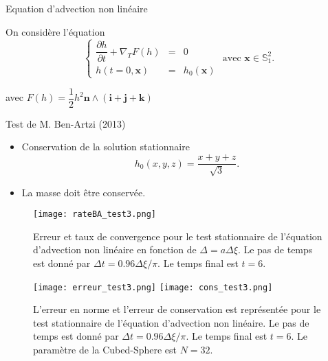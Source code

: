 \documentclass[11pt]{beamer}
\begin{document}
\begin{frame}{Equation d'advection non linéaire}

On considère l'équation
$$
\left\lbrace
\begin{array}{rcl}
\dfrac{\partial h}{\partial t} + \nabla_T F(h) & = & 0  \\
h(t=0,\mathbf{x}) & = & h_0(\mathbf{x})
\end{array}
\right. \text{ avec } \mathbf{x} \in \mathbb{S}_1^2.
$$

avec $F(h) = \dfrac{1}{2} h^2 \mathbf{n} \wedge (\mathbf{i} + \mathbf{j} + \mathbf{k})$ 

\begin{exampleblock}{Test de M. Ben-Artzi  (2013)}
\begin{itemize}
\item Conservation de la solution stationnaire 
$$
h_0(x,y,z) = \dfrac{x+y+z}{\sqrt{3}}.
$$
\item La masse doit être conservée.
\end{itemize}
\end{exampleblock}
\end{frame}



\begin{frame}
\begin{figure}[htbp]
\begin{center}
\texttt{[image: rateBA\_test3.png]}
\end{center}
\caption{Erreur et taux de convergence pour le test stationnaire de l'équation d'advection non linéaire en fonction de $\Delta = a \Delta \xi$. Le pas de temps est donné par $\Delta t = 0.96 \Delta \xi / \pi$. Le temps final est $t=6$.}
\label{fig:benartzi_test3}
\end{figure}
\end{frame}





\begin{frame}
\begin{figure}[htbp]
\begin{center}
\texttt{[image: erreur\_test3.png]}
\texttt{[image: cons\_test3.png]}
\end{center}
\caption{ L'erreur en norme et l'erreur de conservation est représentée pour le test stationnaire de l'équation d'advection non linéaire. Le pas de temps est donné par $\Delta t = 0.96 \Delta \xi / \pi$. Le temps final est $t=6$. Le paramètre de la Cubed-Sphere est $N=32$.}
\label{fig:benartzi_test3_hist}
\end{figure}
\end{frame}
\end{document}
